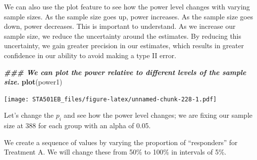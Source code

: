 \documentclass[
]{book}
\newenvironment{Shaded}{\begin{snugshade}}{\end{snugshade}}
\newcommand{\AttributeTok}[1]{\textcolor[rgb]{0.13,0.29,0.53}{#1}}
\newcommand{\DecValTok}[1]{\textcolor[rgb]{0.00,0.00,0.81}{#1}}
\newcommand{\DocumentationTok}[1]{\textcolor[rgb]{0.56,0.35,0.01}{\textbf{\textit{#1}}}}
\newcommand{\FloatTok}[1]{\textcolor[rgb]{0.00,0.00,0.81}{#1}}
\newcommand{\FunctionTok}[1]{\textcolor[rgb]{0.13,0.29,0.53}{\textbf{#1}}}
\newcommand{\NormalTok}[1]{#1}
\newcommand{\OtherTok}[1]{\textcolor[rgb]{0.56,0.35,0.01}{#1}}
\newcommand{\SpecialCharTok}[1]{\textcolor[rgb]{0.81,0.36,0.00}{\textbf{#1}}}
\newcommand{\StringTok}[1]{\textcolor[rgb]{0.31,0.60,0.02}{#1}}
\begin{document}
We can also use the plot feature to see how the power level changes with varying sample sizes. As the sample size goes up, power increases. As the sample size goes down, power decreases. This is important to understand. As we increase our sample size, we reduce the uncertainty around the estimates. By reducing this uncertainty, we gain greater precision in our estimates, which results in greater confidence in our ability to avoid making a type II error.

\begin{Shaded}
\begin{Highlighting}[]
\DocumentationTok{\#\#\# We can plot the power relative to different levels of the sample size. }
\FunctionTok{plot}\NormalTok{(power1)}
\end{Highlighting}
\end{Shaded}

\texttt{[image: STA501EB\_files/figure-latex/unnamed-chunk-228-1.pdf]}

Let's change the \(p_{i}\) and see how the power level changes; we are fixing our sample size at 388 for each group with an alpha of 0.05.

We create a sequence of values by varying the proportion of ``responders'' for Treatment A. We will change these from 50\% to 100\% in intervals of 5\%.

\begin{Shaded}
\end{Shaded}
\end{document}
